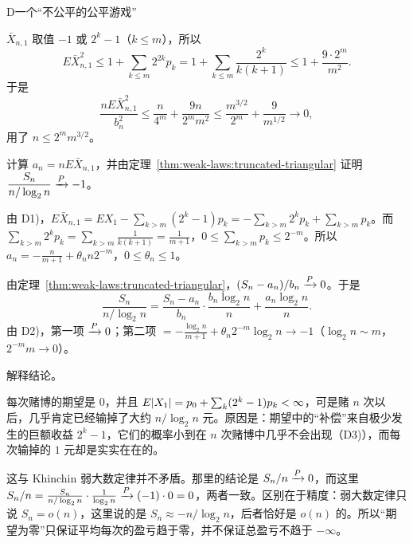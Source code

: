 \begin{probleme}[问题]{D}{一个“不公平的公平游戏”}
\begin{questions}
\begin{solution}
$\bar X_{n,1}$ 取值 $-1$ 或 $2^k-1$（$k\leqslant m$），所以
\[
E\bar X_{n,1}^2\leqslant1+\sum_{k\leqslant m}2^{2k}p_k=1+\sum_{k\leqslant m}\frac{2^k}{k(k+1)}\leqslant1+\frac{9\cdot2^m}{m^2}.
\]
于是
\[
\frac{nE\bar X_{n,1}^2}{b_n^2}\leqslant\frac n{4^m}+\frac{9n}{2^mm^2}\leqslant\frac{m^{3/2}}{2^m}+\frac9{m^{1/2}}\to0,
\]
用了 $n\leqslant2^mm^{3/2}$。
\end{solution}
\item 计算 $a_n=nE\bar X_{n,1}$，并由定理~\ref{thm:weak-laws:truncated-triangular} 证明 $\dfrac{S_n}{n/\log_2n}\xrightarrow{P}-1$。
\begin{solution}
由 D1)，$E\bar X_{n,1}=EX_1-\sum_{k>m}(2^k-1)p_k=-\sum_{k>m}2^kp_k+\sum_{k>m}p_k$。而 $\sum_{k>m}2^kp_k=\sum_{k>m}\frac1{k(k+1)}=\frac1{m+1}$，$0\leqslant\sum_{k>m}p_k\leqslant2^{-m}$。所以 $a_n=-\frac n{m+1}+\theta_nn2^{-m}$，$0\leqslant\theta_n\leqslant1$。

由定理~\ref{thm:weak-laws:truncated-triangular}，$(S_n-a_n)/b_n\xrightarrow{P}0$。于是
\[
\frac{S_n}{n/\log_2n}=\frac{S_n-a_n}{b_n}\cdot\frac{b_n\log_2n}n+\frac{a_n\log_2n}n .
\]
由 D2)，第一项 $\xrightarrow{P}0$；第二项 $=-\frac{\log_2n}{m+1}+\theta_n2^{-m}\log_2n\to-1$（$\log_2n\sim m$，$2^{-m}m\to0$）。
\end{solution}
\item 解释结论。
\begin{solution}
每次赌博的期望是 $0$，并且 $E\lvert X_1\rvert=p_0+\sum_k(2^k-1)p_k<\infty$，可是赌 $n$ 次以后，几乎肯定已经输掉了大约 $n/\log_2n$ 元。原因是：期望中的“补偿”来自极少发生的巨额收益 $2^k-1$，它们的概率小到在 $n$ 次赌博中几乎不会出现（D3)），而每次输掉的 $1$ 元却是实实在在的。

这与 Khinchin 弱大数定律并不矛盾。那里的结论是 $S_n/n\xrightarrow{P}0$，而这里 $S_n/n=\frac{S_n}{n/\log_2n}\cdot\frac1{\log_2n}\xrightarrow{P}(-1)\cdot0=0$，两者一致。区别在于精度：弱大数定律只说 $S_n=o(n)$，这里说的是 $S_n\approx-n/\log_2n$，后者恰好是 $o(n)$ 的。所以“期望为零”只保证平均每次的盈亏趋于零，并不保证总盈亏不趋于 $-\infty$。
\end{solution}
\end{questions}
\end{probleme}


